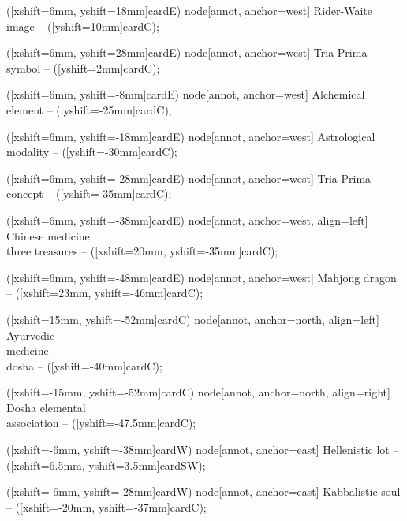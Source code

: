 \documentclass{article}
\begin{document}
\begin{center}
{  
    ([xshift=6mm, yshift=18mm]cardE) node[annot, anchor=west] {Rider-Waite image}
    -- ([yshift=10mm]cardC);

    ([xshift=6mm, yshift=28mm]cardE) node[annot, anchor=west] {Tria Prima symbol}
    -- ([yshift=2mm]cardC);

    ([xshift=6mm, yshift=-8mm]cardE) node[annot, anchor=west] {Alchemical element}
    -- ([yshift=-25mm]cardC);

    ([xshift=6mm, yshift=-18mm]cardE) node[annot, anchor=west] {Astrological modality}
    -- ([yshift=-30mm]cardC);

    ([xshift=6mm, yshift=-28mm]cardE) node[annot, anchor=west] {Tria Prima concept}
    -- ([yshift=-35mm]cardC);

    ([xshift=6mm, yshift=-38mm]cardE) node[annot, anchor=west, align=left] {Chinese medicine\\three treasures}
    -- ([xshift=20mm, yshift=-35mm]cardC);

    ([xshift=6mm, yshift=-48mm]cardE) node[annot, anchor=west] {Mahjong dragon}
    -- ([xshift=23mm, yshift=-46mm]cardC);

    ([xshift=15mm, yshift=-52mm]cardC) node[annot, anchor=north, align=left] {Ayurvedic\\medicine\\dosha}
    -- ([yshift=-40mm]cardC);

    ([xshift=-15mm, yshift=-52mm]cardC) node[annot, anchor=north, align=right] {Dosha elemental\\association}
    -- ([yshift=-47.5mm]cardC);

    ([xshift=-6mm, yshift=-38mm]cardW) node[annot, anchor=east] {Hellenistic lot}
    -- ([xshift=6.5mm, yshift=3.5mm]cardSW);

    ([xshift=-6mm, yshift=-28mm]cardW) node[annot, anchor=east] {Kabbalistic soul}
    -- ([xshift=-20mm, yshift=-37mm]cardC);
}
\end{center}

\newpage

\end{document}
